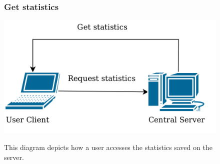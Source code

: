 \begin{figure}[H]
  \subsubsection{Get statistics}
  \centering
  \includegraphics[width=0.5\linewidth]{./system/systemmodel/images/statistics.png}
  \label{statistics}
  \caption{This diagram depicts how a user accesses the statistics saved on the server.}
\end{figure}
